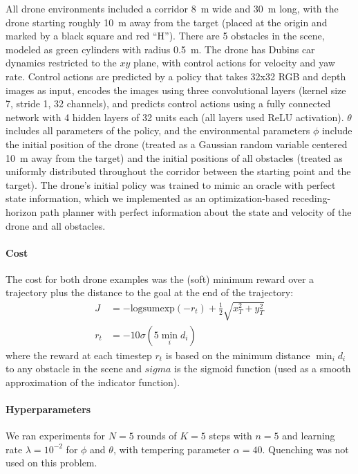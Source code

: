 All drone environments included a corridor \SI{8}{m} wide and \SI{30}{m} long, with the drone starting roughly \SI{10}{m} away from the target (placed at the origin and marked by a black square and red ``H''). There are 5 obstacles in the scene, modeled as green cylinders with radius \SI{0.5}{m}. The drone has Dubins car dynamics restricted to the $xy$ plane, with control actions for velocity and yaw rate. Control actions are predicted by a policy that takes 32x32 RGB and depth images as input, encodes the images using three convolutional layers (kernel size 7, stride 1, 32 channels), and predicts control actions using a fully connected network with 4 hidden layers of 32 units each (all layers used ReLU activation). $\theta$ includes all parameters of the policy, and the environmental parameters $\phi$ include the initial position of the drone (treated as a Gaussian random variable centered \SI{10}{m} away from the target) and the initial positions of all obstacles (treated as uniformly distributed throughout the corridor between the starting point and the target). The drone's initial policy was trained to mimic an oracle with perfect state information, which we implemented as an optimization-based receding-horizon path planner with perfect information about the state and velocity of the drone and all obstacles.

\paragraph{Cost} The cost for both drone examples was the (soft) minimum reward over a trajectory plus the distance to the goal at the end of the trajectory:
\begin{align}
    J   & = -\text{logsumexp}(-r_t) + \frac{1}{2} \sqrt{x_T^2 + y_T^2} \\
    r_t & = -10 \sigma(5 \min_i d_i)
\end{align}
where the reward at each timestep $r_t$ is based on the minimum distance $\min_i d_i$ to any obstacle in the scene and $sigma$ is the sigmoid function (used as a smooth approximation of the indicator function).

\paragraph{Hyperparameters} We ran experiments for $N=5$ rounds of $K=5$ steps with $n=5$ and learning rate $\lambda = 10^{-2}$ for $\phi$ and $\theta$, with tempering parameter $\alpha = 40$. Quenching was not used on this problem.

